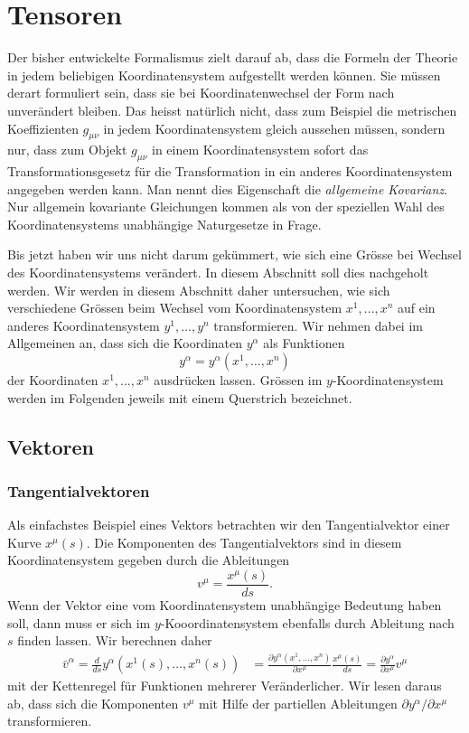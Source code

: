 %
%
%
\section{Tensoren%
\label{skript:section:tensoren}}
Der bisher entwickelte Formalismus zielt darauf ab, dass die Formeln der
Theorie in jedem beliebigen Koordinatensystem aufgestellt werden können.
Sie müssen derart formuliert sein, dass sie bei Koordinatenwechsel
der Form nach unverändert bleiben.
Das heisst natürlich nicht, dass zum Beispiel die metrischen Koeffizienten
$g_{\mu\nu}$ in jedem Koordinatensystem gleich aussehen müssen, sondern
nur, dass zum Objekt $g_{\mu\nu}$ in einem Koordinatensystem sofort
das Transformationsgesetz für die Transformation in ein anderes
Koordinatensystem angegeben werden kann.
Man nennt dies Eigenschaft die {\em allgemeine Kovarianz}.
%
%
Nur allgemein kovariante Gleichungen kommen als von der speziellen
Wahl des Koordinatensystems unabhängige Naturgesetze in Frage.

Bis jetzt haben wir uns nicht darum gekümmert, wie sich eine Grösse
bei Wechsel des Koordinatensystems verändert.
In diesem Abschnitt soll dies nachgeholt werden.
Wir werden in diesem Abschnitt daher untersuchen, wie sich verschiedene
Grössen beim Wechsel vom Koordinatensystem $x^1,\dots,x^n$ auf ein
anderes Koordinatensystem $y^1,\dots,y^n$ transformieren.
Wir nehmen dabei im Allgemeinen an, dass sich die Koordinaten $y^\alpha$
als Funktionen
\[
y^\alpha = y^\alpha(x^1,\dots,x^n)
\]
der Koordinaten $x^1,\dots,x^n$ ausdrücken lassen.
Grössen im $y$-Koordinatensystem werden im Folgenden jeweils mit
einem Querstrich bezeichnet.

\subsection{Vektoren}

\subsubsection{Tangentialvektoren}
%
Als einfachstes Beispiel eines Vektors betrachten wir den Tangentialvektor
einer Kurve $x^\mu(s)$.
Die Komponenten des Tangentialvektors sind in diesem Koordinatensystem
gegeben durch die Ableitungen
\[
v^\mu
=
\frac{x^\mu(s)}{ds}.
\]
Wenn der Vektor eine vom Koordinatensystem unabhängige Bedeutung haben soll,
dann muss er sich im $y$-Kooordinatensystem ebenfalls durch Ableitung nach
$s$ finden lassen.
Wir berechnen daher 
\begin{align}
\bar v^\alpha
=
\frac{d}{ds}y^\alpha(x^1(s),\dots,x^n(s))
&=
\frac{\partial y^\alpha(x^1,\dots,x^n)}{\partial x^\mu}\frac{x^\mu(s)}{ds}
=
\frac{\partial y^\alpha}{\partial x^\mu} v^\mu
\label{skript:trafo:kontra}
\end{align}
mit der Kettenregel für Funktionen mehrerer Veränderlicher.
Wir lesen daraus ab, dass sich die Komponenten $v^\mu$ mit Hilfe der
partiellen Ableitungen $\partial y^\alpha/\partial x^\mu$ transformieren.

